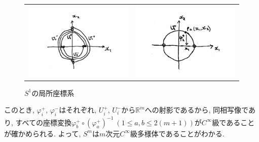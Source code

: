 \documentclass[dvipdfmx,cjk]{beamer}
\theoremstyle{definition}
\begin{document}
  \begin{frame}
    \begin{figure}[H]
      \begin{tabular}{cc}
        \begin{minipage}[t]{0.45\hsize}
          \centering
          \includegraphics[keepaspectratio, scale=0.25]{localCoSysOfS1_1.pdf}
          \caption{$S^1$の開集合}
          \label{}
        \end{minipage} &
        \begin{minipage}[t]{0.45\hsize}
          \centering
          \includegraphics[keepaspectratio, scale=0.25]{localCoSysOfS1_2.pdf}
          \caption{$S^1$の局所座標系}
          \label{}
        \end{minipage}
      \end{tabular}
    \end{figure}

    このとき, 
    $\varphi_i^+$, $\varphi_i^-$はそれぞれ, $U_i^+$, 
    $U_i^-$から$\mathbb{R}^m$への射影であるから, 同相写像であり, 
    すべての座標変換$\varphi_b^+\circ(\varphi_a^+)^{-1}\ 
    (1\leq a, b\leq 2(m+1))$が$C^{\infty}$級であることが確かめられる. 
    よって, $S^m$は$m$次元$C^{\infty}$級多様体であることがわかる. 
\end{frame}
\end{document}
